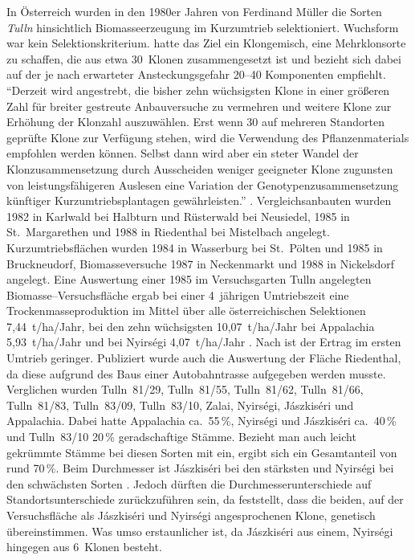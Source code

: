 \documentclass[twocolumn]{scrartcl}
\begin{document}
In Österreich wurden in den 1980er Jahren von Ferdinand Müller die
Sorten \emph{Tulln} hinsichtlich Biomasseerzeugung im Kurzumtrieb
selektioniert. Wuchsform war kein
Selektionskriterium. \citet{mueller1999robinie} hatte das Ziel ein
Klongemisch, eine Mehrklonsorte zu schaffen, die aus etwa 30~Klonen
zusammengesetzt ist und bezieht sich dabei auf
\citet{huehn1986klonanazahl} der je nach erwarteter Ansteckungsgefahr
20--40 Komponenten empfiehlt.
\enquote{Derzeit wird angestrebt, die
  bisher zehn wüchsigsten Klone in einer größeren Zahl für breiter
  gestreute Anbauversuche zu vermehren und weitere Klone zur Erhöhung
  der Klonzahl auszuwählen. Erst wenn 30 auf mehreren Standorten
  geprüfte Klone zur Verfügung stehen, wird die Verwendung des
  Pflanzenmaterials empfohlen werden können. Selbst dann wird aber ein
  steter Wandel der Klonzusammensetzung durch Ausscheiden weniger
  geeigneter Klone zugunsten von leistungsfähigeren Auslesen eine
  Variation der Genotypenzusammensetzung künftiger
  Kurzumtriebsplantagen gewährleisten.} \citep{mueller1999robinie}.
Vergleichsanbauten wurden 1982 in Karlwald bei Halbturn und Rüsterwald
bei Neusiedel, 1985 in St.~Margarethen und 1988 in Riedenthal bei
Mistelbach angelegt. Kurzumtriebsflächen wurden 1984 in Wasserburg bei
St.~Pölten und 1985 in Bruckneudorf, Biomasseversuche 1987 in
Neckenmarkt und 1988 in Nickelsdorf angelegt.  Eine Auswertung einer
1985 im Versuchsgarten Tulln angelegten Biomasse--Versuchsfläche ergab
bei einer 4~jährigen Umtriebszeit eine Trockenmasseproduktion im
Mittel über alle österreichischen Selektionen 7,44~t/ha/Jahr, bei den
zehn wüchsigsten 10,07~t/ha/Jahr bei Appalachia 5,93~t/ha/Jahr und bei
Nyirségi 4,07~t/ha/Jahr \citep{mueller1991robinie}.
Nach \citet{redei2005robinieEnergieholz} ist der Ertrag im ersten
Umtrieb geringer.
Publiziert wurde
auch die Auswertung der Fläche Riedenthal, da diese aufgrund des Baus
einer Autobahntrasse aufgegeben werden musste. Verglichen wurden
Tulln~81/29, Tulln~81/55, Tulln~81/62, Tulln~81/66, Tulln~81/83,
Tulln~83/09, Tulln~83/10, Zalai, Nyirségi, Jászkiséri und
Appalachia. Dabei hatte Appalachia ca.\ 55\,\%, Nyirségi und
Jászkiséri ca.\ 40\,\% und Tulln~83/10 20\,\% geradschaftige Stämme.
Bezieht man auch leicht gekrümmte Stämme bei diesen Sorten mit ein,
ergibt sich ein Gesamtanteil von rund 70\,\%.  Beim Durchmesser ist
Jászkiséri bei den stärksten und Nyirségi bei den schwächsten Sorten
\citep{schueler2006robinie}. Jedoch dürften die
Durchmesserunterschiede auf Standortsunterschiede zurückzuführen sein,
da \citet{heinze2014robinie} feststellt, dass die beiden, auf der
Versuchsfläche als Jászkiséri und Nyirségi angesprochenen Klone,
genetisch übereinstimmen. Was umso erstaunlicher ist, da Jászkiséri
aus einem, Nyirségi hingegen aus 6~Klonen besteht.
\end{document}
